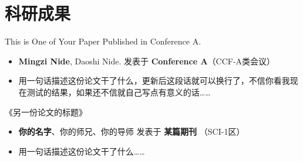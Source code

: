 \documentclass[11pt]{article}
\newlength{\iconwidth}
\begin{document}
    \begin{minipage}[t]{\textwidth}
    \section[科研成果]{\quad 科研成果}

    This is One of Your Paper Published in Conference A.
    \begin{itemize}
        \item \textbf{Mingzi Nide}, Daoshi Nide. \hfill 发表于 \textbf{Conference A}（CCF-A类会议）
        \item 用一句话描述这份论文干了什么，更新后这段话就可以换行了，不信你看我现在测试的结果，如果还不信就自己写点有意义的话\dots\dots
    \end{itemize}

    \vspace{0.5em}
    《另一份论文的标题》
    \begin{itemize}
        \item  \textbf{你的名字}、你的师兄、你的导师 \hfill 发表于 \textbf{某篇期刊} （SCI-1区）
        \item 用一句话描述这份论文干了什么\dots\dots
    \end{itemize}
    
    \vspace{1.2em}
    \end{minipage}
\end{document}

